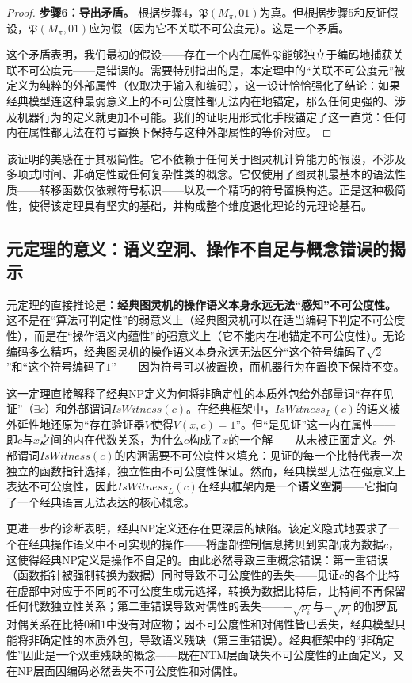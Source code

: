 \documentclass{ctexart}
\newtheorem{proof}[theorem]{证明}
\begin{document}
\begin{proof}
		\textbf{步骤6：导出矛盾。}
		根据步骤4，$\mathfrak{P}(M_\pi, 01)$为真。但根据步骤5和反证假设，$\mathfrak{P}(M_\pi, 01)$应为假（因为它不关联不可公度元）。这是一个矛盾。
		
		这个矛盾表明，我们最初的假设——存在一个内在属性$\mathfrak{P}$能够独立于编码地捕获关联不可公度元——是错误的。需要特别指出的是，本定理中的``关联不可公度元''被定义为纯粹的外部属性（仅取决于输入和编码），这一设计恰恰强化了结论：如果经典模型连这种最弱意义上的不可公度性都无法内在地锚定，那么任何更强的、涉及机器行为的定义就更加不可能。我们的证明用形式化手段锚定了这一直觉：任何内在属性都无法在符号置换下保持与这种外部属性的等价对应。
	\end{proof}
	
	该证明的美感在于其极简性。它不依赖于任何关于图灵机计算能力的假设，不涉及多项式时间、非确定性或任何复杂性类的概念。它仅使用了图灵机最基本的语法性质——转移函数仅依赖符号标识——以及一个精巧的符号置换构造。正是这种极简性，使得该定理具有坚实的基础，并构成整个维度退化理论的元理论基石。
	
	\subsection{元定理的意义：语义空洞、操作不自足与概念错误的揭示}
	
	元定理的直接推论是：\textbf{经典图灵机的操作语义本身永远无法``感知''不可公度性。}这不是在``算法可判定性''的弱意义上（经典图灵机可以在适当编码下判定不可公度性），而是在``操作语义内蕴性''的强意义上（它不能内在地锚定不可公度性）。无论编码多么精巧，经典图灵机的操作语义本身永远无法区分``这个符号编码了$\sqrt{2}$''和``这个符号编码了$1$''——因为符号可以被置换，而机器行为在置换下保持不变。
	
	这一定理直接解释了经典NP定义为何将非确定性的本质外包给外部量词``存在见证''（$\exists c$）和外部谓词$IsWitness(c)$。在经典框架中，$IsWitness_L(c)$的语义被外延性地还原为``存在验证器$V$使得$V(x,c)=1$''。但``是见证''这一内在属性——即$c$与$x$之间的内在代数关系，为什么$c$构成了$x$的一个解——从未被正面定义。外部谓词$IsWitness(c)$的内涵需要不可公度性来填充：见证的每一个比特代表一次独立的函数指针选择，独立性由不可公度性保证。然而，经典模型无法在强意义上表达不可公度性，因此$IsWitness_L(c)$在经典框架内是一个\textbf{语义空洞}——它指向了一个经典语言无法表达的核心概念。
	
	更进一步的诊断表明，经典NP定义还存在更深层的缺陷。该定义隐式地要求了一个在经典操作语义中不可实现的操作——将虚部控制信息拷贝到实部成为数据$c$，这使得经典NP定义是操作不自足的。由此必然导致三重概念错误：第一重错误（函数指针被强制转换为数据）同时导致不可公度性的丢失——见证$c$的各个比特在虚部中对应于不同的不可公度生成元选择，转换为数据比特后，比特间不再保留任何代数独立性关系；第二重错误导致对偶性的丢失——$+\sqrt{p_i}$与$-\sqrt{p_i}$的伽罗瓦对偶关系在比特$0$和$1$中没有对应物；因不可公度性和对偶性皆已丢失，经典模型只能将非确定性的本质外包，导致语义残缺（第三重错误）。经典框架中的``非确定性''因此是一个双重残缺的概念——既在NTM层面缺失不可公度性的正面定义，又在NP层面因编码必然丢失不可公度性和对偶性。
	
\end{document}
